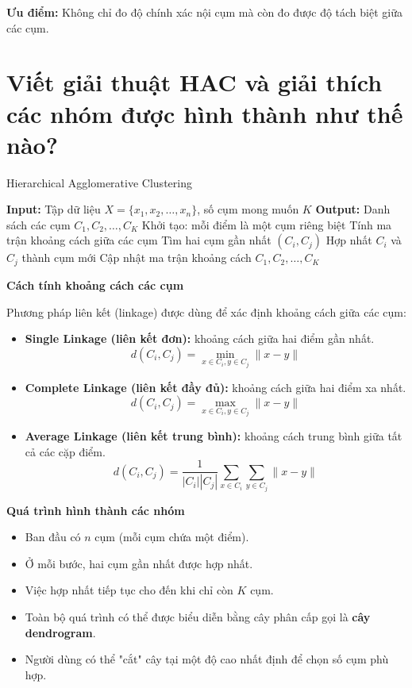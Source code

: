 \documentclass[12pt]{article}
\begin{document}
	\textbf{Ưu điểm:} Không chỉ đo độ chính xác nội cụm mà còn đo được độ tách biệt giữa các cụm.
	
	\section{Viết giải thuật HAC và giải thích các nhóm được hình thành như thế nào?}
	
	\begin{algorithm}[H]
	\caption{Hierarchical Agglomerative Clustering}
	\begin{algorithmic}[1]
	\State \textbf{Input:} Tập dữ liệu $X = \{x_1, x_2, \dots, x_n\}$, số cụm mong muốn $K$
	\State \textbf{Output:} Danh sách các cụm $C_1, C_2, \dots, C_K$
	\State Khởi tạo: mỗi điểm là một cụm riêng biệt
	\State Tính ma trận khoảng cách giữa các cụm
	\State Tìm hai cụm gần nhất $(C_i, C_j)$
	\State Hợp nhất $C_i$ và $C_j$ thành cụm mới
	\State Cập nhật ma trận khoảng cách
	\EndWhile
	\State \Return $C_1, C_2, \dots, C_K$
	\end{algorithmic}
	\end{algorithm}
	
	\textbf{Cách tính khoảng cách các cụm}
	
	Phương pháp liên kết (linkage) được dùng để xác định khoảng cách giữa các cụm:
	
	\begin{itemize}
	\item \textbf{Single Linkage (liên kết đơn):} khoảng cách giữa hai điểm gần nhất.
	\[
	d(C_i, C_j) = \min_{x \in C_i, y \in C_j} \|x - y\|
	\]
	\item \textbf{Complete Linkage (liên kết đầy đủ):} khoảng cách giữa hai điểm xa nhất.
	\[
	d(C_i, C_j) = \max_{x \in C_i, y \in C_j} \|x - y\|
	\]
	\item \textbf{Average Linkage (liên kết trung bình):} khoảng cách trung bình giữa tất cả các cặp điểm.
	\[
	d(C_i, C_j) = \frac{1}{|C_i||C_j|} \sum_{x \in C_i} \sum_{y \in C_j} \|x - y\|
	\]
	\end{itemize}
	
	\textbf{Quá trình hình thành các nhóm}
	
	\begin{itemize}
	\item Ban đầu có $n$ cụm (mỗi cụm chứa một điểm).
	\item Ở mỗi bước, hai cụm gần nhất được hợp nhất.
	\item Việc hợp nhất tiếp tục cho đến khi chỉ còn $K$ cụm.
	\item Toàn bộ quá trình có thể được biểu diễn bằng cây phân cấp gọi là \textbf{cây dendrogram}.
	\item Người dùng có thể "cắt" cây tại một độ cao nhất định để chọn số cụm phù hợp.
	\end{itemize}
	
\end{document}
